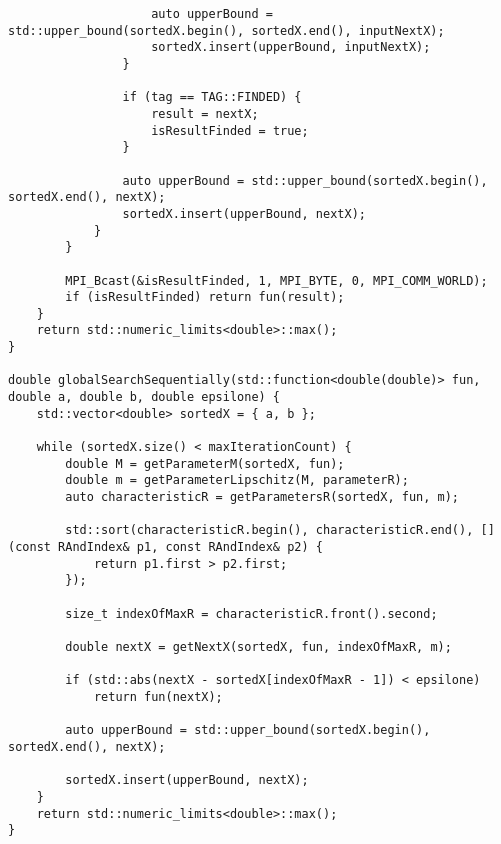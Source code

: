 \documentclass[14pt, a4paper]{extarticle}
\begin{document}
\begin{lstlisting}
                    auto upperBound = std::upper_bound(sortedX.begin(), sortedX.end(), inputNextX);
                    sortedX.insert(upperBound, inputNextX);
                }

                if (tag == TAG::FINDED) {
                    result = nextX;
                    isResultFinded = true;
                }

                auto upperBound = std::upper_bound(sortedX.begin(), sortedX.end(), nextX);
                sortedX.insert(upperBound, nextX);
            }
        }

        MPI_Bcast(&isResultFinded, 1, MPI_BYTE, 0, MPI_COMM_WORLD);
        if (isResultFinded) return fun(result);
    }
    return std::numeric_limits<double>::max();
}

double globalSearchSequentially(std::function<double(double)> fun, double a, double b, double epsilone) {
    std::vector<double> sortedX = { a, b };

    while (sortedX.size() < maxIterationCount) {
        double M = getParameterM(sortedX, fun);
        double m = getParameterLipschitz(M, parameterR);
        auto characteristicR = getParametersR(sortedX, fun, m);

        std::sort(characteristicR.begin(), characteristicR.end(), [](const RAndIndex& p1, const RAndIndex& p2) {
            return p1.first > p2.first;
        });

        size_t indexOfMaxR = characteristicR.front().second;

        double nextX = getNextX(sortedX, fun, indexOfMaxR, m);

        if (std::abs(nextX - sortedX[indexOfMaxR - 1]) < epsilone)
            return fun(nextX);

        auto upperBound = std::upper_bound(sortedX.begin(), sortedX.end(), nextX);

        sortedX.insert(upperBound, nextX);
    }
    return std::numeric_limits<double>::max();
}

	\end{lstlisting}
	\newpage
\end{document}
